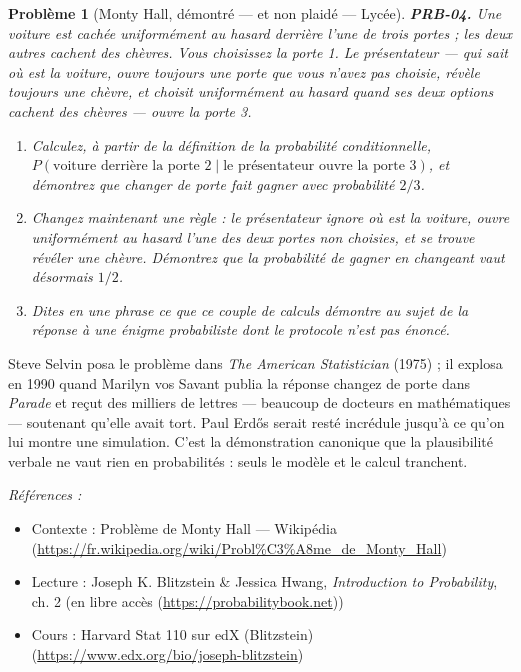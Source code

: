 \documentclass[11pt]{article}
\newtheorem{problem}{Problème}
\newenvironment{refs}{\par\small\noindent\emph{Références :}\begin{itemize}\setlength\itemsep{0pt}}{\end{itemize}\normalsize}
\begin{document}
\begin{problem}[{Monty Hall, démontré --- et non plaidé --- Lycée}]
\textbf{PRB-04.} Une voiture est cachée uniformément au hasard derrière
l'une de trois portes ; les deux autres cachent des chèvres. Vous choisissez la porte 1. Le
présentateur --- qui sait où est la voiture, ouvre toujours une porte que vous n'avez pas choisie,
révèle toujours une chèvre, et choisit uniformément au hasard quand ses deux options cachent des
chèvres --- ouvre la porte 3.
\begin{enumerate}
\item[(i)] Calculez, à partir de la
définition de la probabilité conditionnelle, $ P(\text{voiture derrière la porte 2} \mid
\text{le présentateur ouvre la porte 3}) $, et démontrez que changer de porte fait gagner avec
probabilité $ 2/3 $.
\item[(ii)] Changez maintenant une règle : le présentateur ignore où est la voiture, ouvre uniformément
au hasard l'une des deux portes non choisies, et \textit{se trouve} révéler une chèvre. Démontrez
que la probabilité de gagner en changeant vaut désormais $ 1/2 $.
\item[(iii)] Dites en une phrase ce que ce couple de
calculs démontre au sujet de \og{} la \fg{} réponse à une énigme probabiliste dont le protocole n'est pas
énoncé.
\end{enumerate}

\end{problem}

\noindent Steve Selvin posa le problème dans \textit{The American Statistician} (1975) ; il
explosa en 1990 quand Marilyn vos Savant publia la réponse \og{} changez de porte \fg{} dans
\textit{Parade} et reçut des milliers de lettres --- beaucoup de docteurs en mathématiques ---
soutenant qu'elle avait tort. Paul Erd\H{o}s serait resté incrédule jusqu'à ce qu'on lui montre une
simulation. C'est la démonstration canonique que la plausibilité verbale ne vaut rien en
probabilités : seuls le modèle et le calcul tranchent.

\begin{refs}
\item Contexte : Problème de Monty Hall --- Wikipédia (\url{https://fr.wikipedia.org/wiki/Probl%C3%A8me_de_Monty_Hall})
\item Lecture : Joseph K. Blitzstein \& Jessica Hwang, \textit{Introduction to Probability}, ch. 2 (en libre accès (\url{https://probabilitybook.net}))
\item Cours : Harvard Stat 110 sur edX (Blitzstein) (\url{https://www.edx.org/bio/joseph-blitzstein})
\end{refs}
\end{document}
